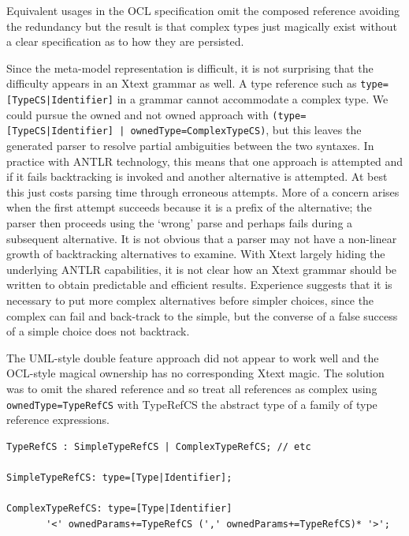 \documentclass{eceasst}
\begin{document}
Equivalent usages in the OCL specification omit the composed reference avoiding the redundancy but the result is that complex types just magically exist without a clear specification as to how they are persisted.

Since the meta-model representation is difficult, it is not surprising that the difficulty appears in an Xtext grammar as well. A  type reference such as \verb+type=[TypeCS|Identifier]+ in a grammar cannot accommodate a complex type. We could pursue the owned and not owned approach with \verb+(type=[TypeCS|Identifier] | ownedType=ComplexTypeCS)+, but this leaves the generated parser to resolve partial ambiguities between the two syntaxes. In practice with ANTLR technology, this means that one approach is attempted and if it fails backtracking is invoked and another alternative is attempted. At best this just costs parsing time through erroneous attempts. More of a concern arises when the first attempt succeeds because it is a prefix of the alternative; the parser then proceeds using the `wrong' parse and perhaps fails during a subsequent alternative. It is not obvious that a parser may not have a non-linear growth of backtracking alternatives to examine. With Xtext largely hiding the underlying ANTLR capabilities, it is not clear how an Xtext grammar should be written to obtain predictable and efficient results. Experience suggests that it is necessary to put more complex alternatives before simpler choices, since the complex can fail and back-track to the simple, but the converse of a false success of a simple choice does not backtrack.

The UML-style double feature approach did not appear to work well and the OCL-style magical ownership has no corresponding Xtext magic. The solution was to omit the shared reference and so treat all references as complex using \verb+ownedType=TypeRefCS+ with TypeRefCS the abstract type of a family of type reference expressions.

{\small\begin{verbatim}
TypeRefCS : SimpleTypeRefCS | ComplexTypeRefCS; // etc

SimpleTypeRefCS: type=[Type|Identifier];

ComplexTypeRefCS: type=[Type|Identifier]
       '<' ownedParams+=TypeRefCS (',' ownedParams+=TypeRefCS)* '>';
\end{verbatim}}
\end{document}
